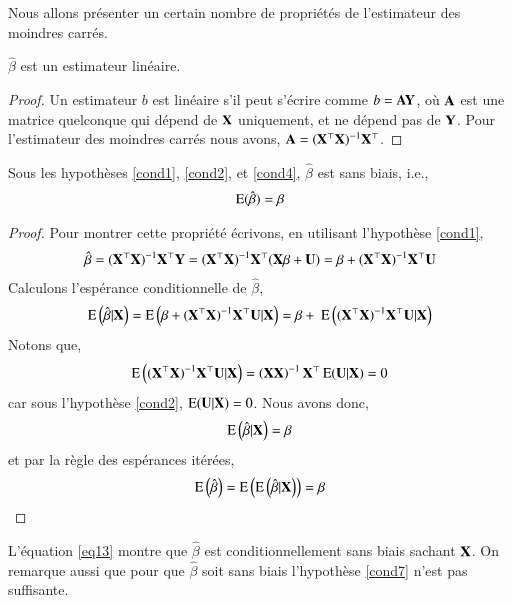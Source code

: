 \documentclass[10pt, reqno]{amsart}
\begin{document}
Nous allons présenter un certain nombre de propriétés de l'estimateur des moindres carrés.
\begin{propriete}$\hat{\beta}$ est un estimateur linéaire.
\end{propriete}
\begin{proof}
Un estimateur $b$ est linéaire s'il peut s'écrire comme $b=\mathbf A\mathbf Y$, où $\mathbf A$ est une matrice quelconque qui dépend de $\mathbf X $ uniquement, et ne dépend pas de $\mathbf Y$. Pour l'estimateur des moindres carrés nous avons, $\mathbf A = (\mathbf X ^\top\mathbf X )^{-1}\mathbf X ^\top$.
\end{proof}
\begin{propriete}
Sous les hypothèses \eqref{cond1}, \eqref{cond2}, et \eqref{cond4}, $\hat{\beta}$ est sans biais, i.e.,
\begin{align*}
\operatorname{E}(\hat{\beta}) = \beta
\end{align*}
\end{propriete}
\begin{proof}
Pour montrer cette propriété écrivons, en utilisant l'hypothèse \eqref{cond1},
\begin{align*}
\hat{\beta} = (\mathbf X ^\top\mathbf X )^{-1}\mathbf X ^\top\mathbf Y =  (\mathbf X ^\top\mathbf X )^{-1}\mathbf X ^\top (\mathbf X \beta + \mathbf U) = 
\beta + (\mathbf X ^\top\mathbf X )^{-1}\mathbf X ^\top\mathbf U
\end{align*}
Calculons l'espérance conditionnelle de $\hat{\beta}$,
\begin{align*}
\Exp\left(\hat{\beta} | \boldX \right) = \Exp\left(\beta + (\boldX ^\top\boldX )^{-1}\boldX ^\top\boldU | \boldX \right) = \beta +\ \Exp\left((\boldX ^\top\boldX )^{-1}\boldX ^\top\boldU | \boldX \right)
\end{align*}
Notons que,
\begin{align*}
\operatorname{E}\left((\mathbf X ^\top\mathbf X )^{-1}\mathbf X ^\top\mathbf U | \mathbf X \right) = 
\left(\mathbf X \mathbf X \right)^{-1}\mathbf X ^\top\operatorname{E}(\mathbf U|\mathbf X ) = 0
\end{align*} 
car sous l'hypothèse \eqref{cond2}, $\operatorname{E}(\mathbf U|\mathbf X ) = 0$. Nous avons donc,
\begin{align}
\operatorname{E}\left(\hat{\beta} | \mathbf X \right) = \beta
\label{eq13}
\end{align}
et par la règle des espérances itérées,
\begin{align*}
\operatorname{E}\left(\hat{\beta}\right) = \operatorname{E}\left(\operatorname{E}\left(\hat{\beta} | \mathbf X \right)\right)=\beta
\end{align*}
\end{proof}
L'équation \eqref{eq13} montre que $\hat{\beta}$ est conditionnellement sans biais sachant $\mathbf X $. On remarque aussi que pour que $\hat{\beta}$ soit sans biais l'hypothèse \eqref{cond7} n'est pas suffisante.
\end{document}
